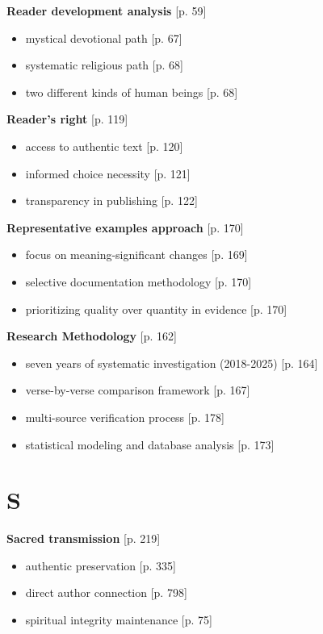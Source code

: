 \documentclass[11pt,twoside]{book}
\begin{document}
\textbf{\textbf{Reader development analysis}} {[}p. 59]
\begin{itemize}
\item mystical devotional path [p. 67]
\item systematic religious path [p. 68]
\item two different kinds of human beings [p. 68]
\end{itemize}

\textbf{\textbf{Reader's right}} {[}p. 119]
\begin{itemize}
\item access to authentic text [p. 120]
\item informed choice necessity [p. 121]
\item transparency in publishing [p. 122]
\end{itemize}

\textbf{\textbf{Representative examples approach}} {[}p. 170]
\begin{itemize}
\item focus on meaning-significant changes [p. 169]
\item selective documentation methodology [p. 170]
\item prioritizing quality over quantity in evidence [p. 170]
\end{itemize}

\textbf{\textbf{Research Methodology}} {[}p. 162]
\begin{itemize}
\item seven years of systematic investigation (2018-2025) [p. 164]
\item verse-by-verse comparison framework [p. 167]
\item multi-source verification process [p. 178]
\item statistical modeling and database analysis [p. 173]
\end{itemize}
\section*{S}
\label{sec:orgeabe8ab}

\textbf{\textbf{Sacred transmission}} {[}p. 219]
\begin{itemize}
\item authentic preservation [p. 335]
\item direct author connection [p. 798]
\item spiritual integrity maintenance [p. 75]
\end{itemize}
\end{document}
